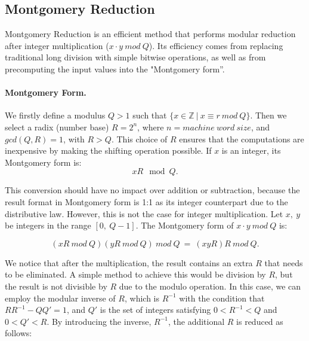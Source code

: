 \documentclass[11pt,
  titlepage=false,
  abstract=on,
]{scrreprt}
\begin{document}


\subsection{Montgomery Reduction}
Montgomery Reduction \cite{montgomery1985modular} is an efficient method that performs modular reduction after integer multiplication ($x \cdot y\ mod\ Q$).
Its efficiency comes from replacing traditional long division with simple bitwise operations, as well as from precomputing the input values into the "Montgomery form''.

\paragraph{Montgomery Form.} We firstly define a modulus $Q > 1$ such that $\{x \in \mathbb{Z}\ |\ x \equiv r\ mod\ Q\}$. Then we select a radix (number base) $R = 2^n$, where 
$n = machine\ word\ size$, and $gcd(Q, R) = 1$, with $R > Q$. This choice of $R$ ensures that the computations are inexpensive by making the shifting operation possible.
If $x$ is an integer, its Montgomery form is:
\begin{equation*}
  xR \mod Q. 
\end{equation*}

This conversion should have no impact over addition or subtraction, because the result format in Montgomery
form is 1:1 as its integer counterpart due to the distributive law.
However, this is not the case for integer multiplication. Let $x,\ y$ be integers in the range $[0,\ Q-1]$. The Montgomery form of $x\cdot y\ mod\ Q$ is:

\begin{equation*}
  (xR\ mod\ Q)(yR\ mod\ Q)\ mod\ Q\ =\ (xyR)R\ mod\ Q.
\end{equation*}

We notice that after the multiplication, the result contains an extra $R$ that needs to be eliminated. A simple method to achieve this would be division by $R$, but
the result is not divisible by $R$ due to the modulo operation. In this case, we can employ the modular inverse of $R$, which is $R^{-1}$ with the condition that $RR^{-1} - QQ' = 1$,
and $Q'$ is the set of integers satisfying  $0 < R^{-1} < Q$ and $0 < Q' < R$.
By introducing the inverse, $R^{-1}$, the additional $R$ is reduced as follows:
\end{document}
